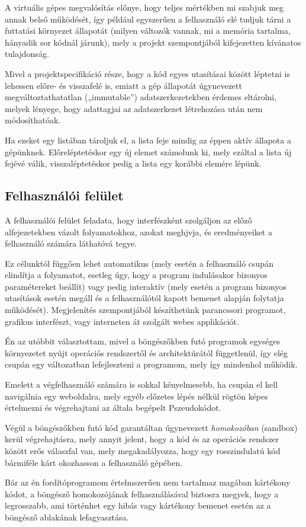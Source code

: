 A virtuális gépes megvalósítás előnye, hogy teljes mértékben mi szabjuk meg annak belső működését, így például egyszerűen a felhasználó elé tudjuk tárni a futtatási környezet állapotát (milyen változók vannak, mi a memória tartalma, hányadik sor kódnál járunk), mely a projekt szempontjából kifejezetten kívánatos tulajdonság.

Mivel a projektspecifikáció része, hogy a kód egyes utasításai között léptetni is lehessen előre- és visszafelé is, emiatt a gép állapotát úgynevezett megváltoztathatatlan („immutable”) adatszerkezetekben érdemes eltárolni, melyek lényege, hogy adattagjai az adatszerkezet létrehozása után nem módosíthatóak. 

Ha ezeket egy listában tároljuk el, a lista feje mindig az éppen aktív állapota a gépünknek. Előreléptetéskor egy új elemet számolunk ki, mely ezáltal a lista új fejévé válik, visszaléptetéskor pedig a lista egy korábbi elemére lépünk.

\subsection{Felhasználói felület}

A felhasználói felület feladata, hogy interfészként szolgáljon az előző alfejezetekben vázolt folyamatokhoz, azokat meghjvja, és eredményeiket a felhasználó számára láthatóvá tegye.

Ez célunktól függően lehet automatikus (mely esetén a felhasználó csupán elindítja a folyamatot, esetleg úgy, hogy a program indulásakor bizonyos paramétereket beállít) vagy pedig interaktív (mely esetén a program bizonyos utasítások esetén megáll és a felhasználótól kapott bemenet alapján folytatja működését). Megjelenítés szempontjából készíthetünk parancssori programot, grafikus interfészt, vagy interneten át szolgált webes applikációt.

Én az utóbbit választottam, mivel a böngészőkben futó programok egységes környezetet nyújt operációs rendszertől és architektúrától függetlenül, így elég csupán egy változatban lefejleszteni a programom, mely így mindenhol működik.

Emelett a végfelhasználó számára is sokkal kényelmesebb, ha csupán el kell navigálnia egy weboldalra, mely egyéb előzetes lépés nélkül rögtön képes értelmezni és végrehajtani az általa begépelt Pszeudokódot.

Végül a böngészőkben futó kód garantáltan úgynevezett \textit{homokozóban} (sandbox) kerül végrehajtásra, mely annyit jelent, hogy a kód és az operációs rendszer között erős válaszfal van, mely megakadályozza, hogy egy rosszindulatú kód bármiféle kárt okozhasson a felhasználó gépében.

Bár az én fordítóprogramom értelmszerűen nem tartalmaz magában kártékony kódot, a böngésző homokozójának felhasználásával biztosra megyek, hogy a legrosszabb, ami történhet egy hibás vagy kártékony bemenet esetén az a böngésző ablakának lefagyasztása.